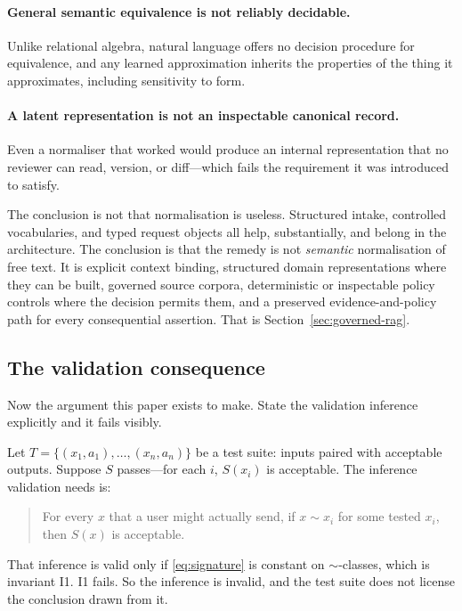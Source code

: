 \paragraph{General semantic equivalence is not reliably decidable.} Unlike
relational algebra, natural language offers no decision procedure for equivalence,
and any learned approximation inherits the properties of the thing it approximates,
including sensitivity to form.

\paragraph{A latent representation is not an inspectable canonical record.} Even a
normaliser that worked would produce an internal representation that no reviewer
can read, version, or diff---which fails the requirement it was introduced to
satisfy.

The conclusion is not that normalisation is useless. Structured intake, controlled
vocabularies, and typed request objects all help, substantially, and belong in the
architecture. The conclusion is that the remedy is not \emph{semantic}
normalisation of free text. It is explicit context binding, structured domain
representations where they can be built, governed source corpora, deterministic or
inspectable policy controls where the decision permits them, and a preserved
evidence-and-policy path for every consequential assertion. That is
Section~\ref{sec:governed-rag}.

\subsection{The validation consequence}
\label{sec:validation-consequence}

Now the argument this paper exists to make. State the validation inference
explicitly and it fails visibly.

Let $T = \{(x_1, a_1), \ldots, (x_n, a_n)\}$ be a test suite: inputs paired with
acceptable outputs. Suppose $S$ passes---for each $i$, $S(x_i)$ is acceptable. The
inference validation needs is:

\begin{quote}
For every $x$ that a user might actually send, if $x \sim x_i$ for some tested
$x_i$, then $S(x)$ is acceptable.
\end{quote}

That inference is valid only if \eqref{eq:signature} is constant on $\sim$-classes,
which is invariant I1. I1 fails. So the inference is invalid, and the test suite
does not license the conclusion drawn from it.

